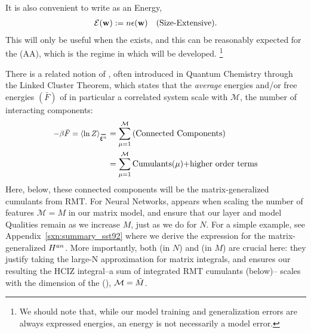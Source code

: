 It is also convenient to write \emph{\TotalEffectivePotential} as an Energy, 
\begin{align}
 \label{eqn:detox}
 \mathcal{E}(\mathbf{w}) := n\epsilon({\mathbf{w}})\quad \text{(Size-Extensive)}.
\end{align}
This will only be useful when the \ThermodynamicLimit exists, and this
can be reasonably expected for the \AnnealedApproximation (AA),
which is the regime in which \SETOL will be developed.%
\footnote{We should note that, while our model training and generalization errors are always expressed energies, an energy is not necessarily a model error.  }

There is a related notion of \emph{\SizeConsistency},
often introduced in Quantum Chemistry through the Linked Cluster Theorem\cite{Hubbard1959,Brandow1963},
which states that the \emph{average} energies and/or free energies $(\bar{F})$ of in particular a correlated system scale with $\mathcal{M}$,
the number of interacting components:
\begin{align}
  \label{eqn:LCT}
  -\beta \bar{F}=\langle \ln Z \rangle_{\AVGNDXIn} &= \sum_{\mu=1}^{\mathcal{M}}\text{(Connected Components)} \\ \nonumber
  &= \sum_{\mu=1}^{\mathcal{M}}\text{Cumulants($\mu$)+higher order terms} 
\end{align}
Here, below, these connected components will be the matrix-generalized cumulants from RMT.
For Neural Networks, \SizeConsistency appears when scaling the number of features $\mathcal{M}=M$ in our matrix model,
and ensure that our layer and model Qualities  remain \SizeConsistent as we increase $M$, just as we do for $N$.
For a simple example, see Appendix~\ref{sxn:summary_sst92}
 where we derive the expression for the matrix-generalized
\AnnealedHamiltonian $H^{an}$.  
More importantly, both \SizeExtensivity (in $N$) and \SizeConsistency (in $M$)
are crucial here:  they justify taking the large-N approximation for matrix integrals, and ensures
our resulting the HCIZ integral--a sum of integrated RMT cumulants (below)--
scales with the dimension of the \EffectiveCorrelationSpace (\ECS), $\mathcal{M}=\tilde{M}$.


